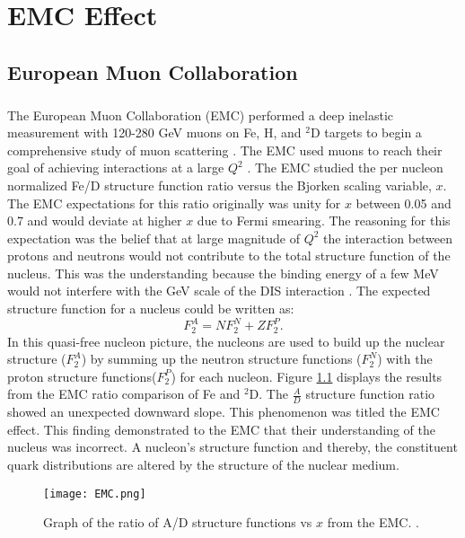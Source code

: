 \chapter{EMC Effect}	
\section{European Muon Collaboration}\label{sec:EMC}
\paragraph{}The European Muon Collaboration (EMC) performed a deep inelastic measurement with 120-280 GeV muons on Fe, H, and $^2$D targets to begin a comprehensive study of muon scattering \cite{challenge, Norton}. The EMC used muons to reach their goal of achieving interactions at a large $Q^2$ \cite{seelyth}. The EMC studied the per nucleon normalized Fe/D structure function ratio versus the Bjorken scaling variable, $x$. The EMC expectations for this ratio originally was unity for $x$ between 0.05 and 0.7 and would deviate at higher $x$ due to Fermi smearing\cite{CC}. The reasoning for this expectation was the belief that at large magnitude of $Q^2$ the interaction between protons and neutrons would not contribute to the total structure function of the nucleus. This was the understanding because the binding energy of a few MeV would not interfere with the GeV scale of the DIS interaction \cite{Ajth}. The expected structure function for a nucleus could be written as:
\begin{equation}
F_2^A = N F_2^N + ZF_2^P.
\end{equation}
In this quasi-free nucleon picture, the nucleons are used to build up the nuclear structure ($F_2^A$) by summing up the neutron structure functions ($F_2^N$) with the proton structure functions($F_2^P$) for each nucleon. Figure \ref{EMCOld} displays the results from the EMC ratio comparison of Fe and $^2$D. The $\frac{A}{D}$ structure function ratio showed an unexpected downward slope. This phenomenon was titled the EMC effect. This finding demonstrated to the EMC that their understanding of the nucleus was incorrect. A nucleon's structure function and thereby, the constituent quark distributions are altered by the structure of the nuclear medium. 
\begin{figure}[t]
	\centering
	\texttt{[image: EMC.png]} 
	\caption{ Graph of the ratio of A/D structure functions vs $x$ from the EMC. \cite{CC,EM}.}
	\label{EMCOld}
\end{figure} 
